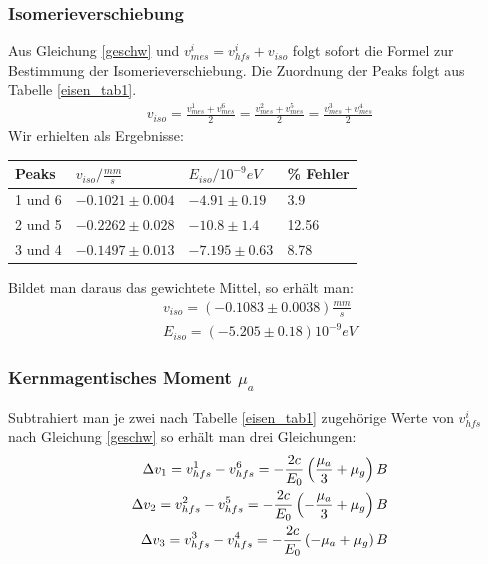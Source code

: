 \documentclass[12pt]{article}
\begin{document}
\subsubsection{Isomerieverschiebung}
Aus Gleichung \ref{geschw} und $v_{mes}^i = v_{hfs}^i + v_{iso}$ folgt sofort die Formel zur Bestimmung der Isomerieverschiebung. Die Zuordnung 
der Peaks folgt aus Tabelle \ref{eisen_tab1}.
\begin{align*}
 v_{iso} = \frac{v_{mes}^1+v_{mes}^6}{2} =\frac{v_{mes}^2+v_{mes}^5}{2} =\frac{v_{mes}^3+v_{mes}^4}{2}
\end{align*}
Wir erhielten als Ergebnisse:
\begin{center}
\begin{tabular}{|l|lll|}
\hline
Peaks & $v_{iso}/\frac{mm}{s}$ & $E_{iso}/10^{-9}eV$ & \% Fehler\\
\hline
1 und 6& $-0.1021 \pm 0.004$ & $-4.91 \pm 0.19$ & 3.9\\
2 und 5& $-0.2262 \pm 0.028$ & $-10.8 \pm 1.4$ & 12.56\\
3 und 4& $-0.1497 \pm 0.013$ & $-7.195 \pm 0.63$ & 8.78\\
\hline
\end{tabular}
\label{eisen_tabiso}
\end{center}

Bildet man daraus das gewichtete Mittel, so erhält man:
\begin{align*}
 v_{iso} = (-0.1083\pm 0.0038)\frac{mm}{s} \\
 E_{iso} = (-5.205 \pm 0.18)10^{-9} eV
\end{align*}

\subsubsection[Kernmagentisches Moment]{Kernmagentisches Moment $\mu_a$}
Subtrahiert man je zwei nach Tabelle \ref{eisen_tab1} zugehörige Werte von $v_{hfs}^i$ nach Gleichung \ref{geschw} so erhält man drei Gleichungen:
\begin{align}
 \notag \Delta v_1=v_{hfs}^1 - v_{hfs}^6 = -\frac{2c}{E_0} \left( \frac{\mu_a}{3} + \mu_g \right) B \\
 \Delta v_2=v_{hfs}^2 - v_{hfs}^5 = -\frac{2c}{E_0} \left( -\frac{\mu_a}{3} + \mu_g \right) B \\
 \notag \Delta v_3=v_{hfs}^3 - v_{hfs}^4 = -\frac{2c}{E_0} \left( -\mu_a + \mu_g \right) B 
\label{diff_geschw}
\end{align}
\end{document}

